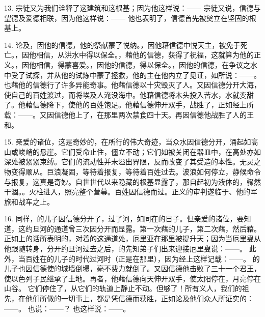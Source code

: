 13. 宗徒又为我们诠释了这建筑和这根基；因为他这样说：—— 宗徒又说，信德与望德及爱德相联，因为他这样说：—— 他也表明了，信德首先被奠立在坚固的根基上。\par

14. 论及，因他的信德，他的祭献蒙了悦纳。，因他藉信德中悦天主，被免于死亡。，因他相信，从洪水中得以保全。，藉他的信德，获得了祝福，这就算为他的正义。，因他相信，得蒙喜爱。，因他的信德，得以保全。，因他的信德，在争议之水中受了试探，并从他的试炼中蒙了拯救，他的主在他内立了见证，如所说：——。也藉他的信德行了许多异能奇事。他藉信德以十灾毁灭了人。又因信德分开大海，使自己的百姓渡过，而将埃及人淹没海中。他藉信德将木头投入苦水，水就变甜了。他藉信德降下，使他的百姓饱足。他藉信德伸开双手，战胜了，正如经上所载：——。又因信德他上了，在那里两次禁食四十天。再因信德他战胜了人的王和。\par

15. 亲爱的诸位，这是奇妙的，在所行的伟大奇迹，当众水因信德分开，涌起如高山或峻峭的悬崖。它们受命止住，僵立不动；它们如被关闭在器皿中，在高处亦如深处被紧紧束缚。它们的流动性并未溢出界限，反而改变了其受造的本性。无灵之物变得顺从。巨浪凝固，等待着报复，等待着百姓过去。波浪如何停立，静候命令与报复，这真是奇妙。自世世代以来隐藏的根基显露了，那自起初为液体的，骤然干涸。。火柱进入，照亮整个营幕。百姓因信德而过。正义的审判遂临于、他的军旅和战车之上。\par

16. 同样，的儿子因信德分开了，过了河，如同在的日子。但亲爱的诸位，要知道，这约旦河的通道曾三次因分开而显露。第一次藉的儿子，第二次藉，然后藉。正如上的话所表明的，对着的这通道处，厄里亚在那里被提升天；因为当厄里叟从他跟随转身，分开约旦河过去之后，的先知弟子们出来迎接厄里叟说：——。 此外，当百姓在的儿子的时代过河时（正是在那里），因为经上这样记载：——。 的儿子也因信德使的城墙倒塌，毫不费力就倒了。又因信德他击败了三十一个君王，使以色列子民继承了土地。再者，他藉信德向天伸开双手，使太阳停在，月亮停在山谷。 它们停住了，从它们的轨道上静止不动。但够了！所有义人，我们的祖先，在他们所做的一切事上，都是凭信德而获胜，正如论及他们众人所证实的：——。 也说：——？ 也这样说：——。\par

